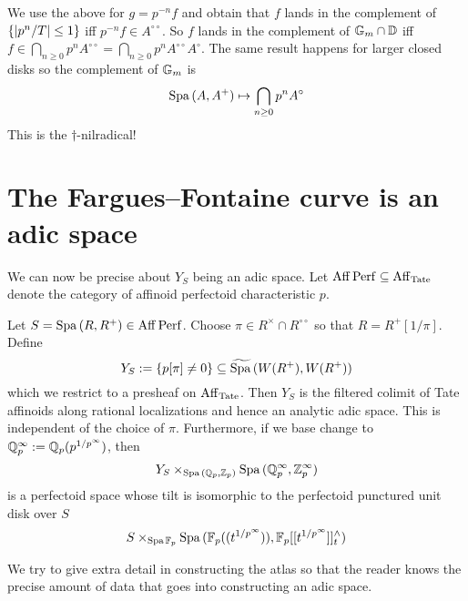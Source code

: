 \documentclass{article}
\begin{document}
\begin{eg}
  We use the above for $g = p^{-n} f$
  and obtain that $f$ lands in the complement of 
  $\left\{\left\vert p^n / T \right\vert \leq 1\right\}$ iff 
  $p^{-n} f \in A^{\circ\circ}$.
  So $f$ lands in the complement of $\mathbb{G}_m \cap \mathbb{D}$
  iff $f \in \bigcap_{n \geq 0} p^{n} A^{\circ\circ} 
  = \bigcap_{n \geq 0} p^{n} A^{\circ\circ} A^{\circ}$.
  The same result happens for larger closed disks
  so the complement of $\mathbb{G}_m$ is 
  \[
    \mathrm{Spa}\,(A , A^+) \mapsto \bigcap_{n \geq 0} p^n A^\circ
  \]
  This is the $\dagger$-nilradical!
\end{eg}

\section{The Fargues--Fontaine curve is an adic space}

We can now be precise about $Y_S$ being an adic space.
Let $\mathrm{Aff}\operatorname{Perf} \subseteq \mathrm{Aff}_{\mathrm{Tate}}$ denote 
the category of affinoid perfectoid characteristic $p$.
\begin{prop}
  
  Let $S = \mathrm{Spa}\, (R , R^+) \in \mathrm{Aff}\operatorname{Perf}$.
  Choose $\pi \in R^{\times} \cap R^{\circ\circ}$
  so that $R = R^+[1 / \pi]$.
  Define \[
    Y_S := \left\{p [\pi] \neq 0\right\} \subseteq \widetilde{\mathrm{Spa}\,}(W(R^+) , W(R^+))
  \]
  which we restrict to a presheaf on $\mathrm{Aff}_{\mathrm{Tate}}$.
  Then $Y_S$ is the filtered colimit of
  Tate affinoids along rational localizations 
  and hence an analytic adic space.
  This is independent of the choice of $\pi$.
  Furthermore,
  if we base change to $\mathbb{Q}_p^\infty := \mathbb{Q}_p(p^{1 / p^\infty})$,
  then \[
    Y_S \times_{\mathrm{Spa}\,(\mathbb{Q}_p , \mathbb{Z}_p)} \mathrm{Spa}\,(\mathbb{Q}_p^\infty , \mathbb{Z}_p^\infty)
  \]
  is a perfectoid space whose tilt is isomorphic to 
  the perfectoid punctured unit disk over $S$
  \[
    S \times_{\mathrm{Spa}\, \mathbb{F}_p} 
    \mathrm{Spa}\, (\mathbb{F}_p((t^{1 / p^\infty})) , \mathbb{F}_p[[t^{1 / p^\infty}]]^\wedge_t)
  \]
\end{prop}
We try to give extra detail in constructing the atlas 
so that the reader knows 
the precise amount of data that goes into constructing an adic space.
\end{document}

